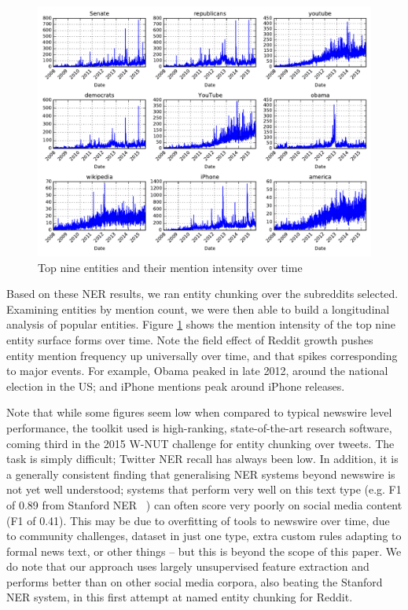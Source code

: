 \documentclass[10pt,journal,compsoc]{IEEEtran}
\begin{document}
\begin{figure}
\begin{center}
\includegraphics[width=\columnwidth]{plots/entity_ts.pdf}
\caption{Top nine entities and their mention intensity over time}
\label{fig:entity-ts}
\end{center}
\end{figure}

Based on these NER results, we ran entity chunking over the subreddits selected.
Examining entities by mention count, we were then able to build a longitudinal analysis of popular entities.
Figure \ref{fig:entity-ts} shows the mention intensity of the top nine entity surface forms over time.
Note the field effect of Reddit growth pushes entity mention frequency up universally over time, and that spikes corresponding to major events.
For example, Obama peaked in late 2012, around the national election in the US; and iPhone mentions peak around iPhone releases.

Note that while some figures seem low when compared to typical newswire level performance, the toolkit used is high-ranking, state-of-the-art research software, coming third in the 2015 W-NUT challenge for entity chunking over tweets.
The task is simply difficult; Twitter NER recall has always been low.
In addition, it is a generally consistent finding that generalising NER systems beyond newswire is not yet well understood; systems that perform very well on this text type (e.g. F1 of 0.89 from Stanford NER~\cite{derczynski2015analysis}%
) can often score very poorly on social media content (F1 of 0.41).
This may be due to overfitting of tools to newswire over time, due to community challenges, dataset in just one type, extra custom rules adapting to formal news text, or other things -- but this is beyond the scope of this paper.
We do note that our approach uses largely unsupervised feature extraction and performs better than on other social media corpora, also beating the Stanford NER system, in this first attempt at named entity chunking for Reddit.
\end{document}
